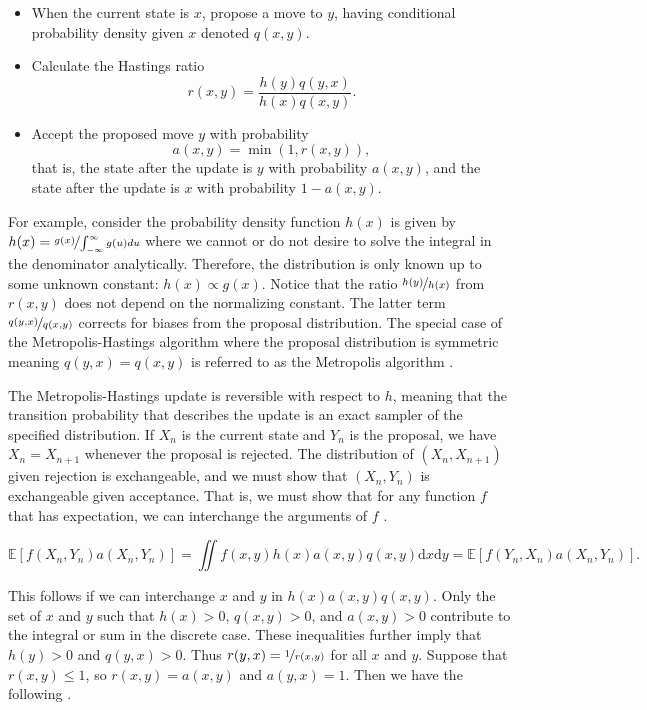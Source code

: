 \documentclass[../../../main.tex]{subfiles}
\begin{document}
\begin{itemize}
\item When the current state is $x$, propose a move to $y$, having conditional probability density given $x$ denoted $q(x, y)$.
\item Calculate the Hastings ratio
\begin{equation}
r(x,y) = \frac{h(y)q(y,x)}{h(x)q(x,y)}.
\end{equation}
\item Accept the proposed move $y$ with probability
\begin{equation}
a(x,y) = \min(1,r(x,y)),
\end{equation}
that is, the state after the update is $y$ with probability $a(x,y)$, and the state after the update is $x$ with probability $1-a(x,y)$.
\end{itemize}

For example, consider the probability density function $h(x)$ is given by $h(x) = \nicefrac{g(x)}{\int_{-\infty}^{\infty}g(u)du}$ where we cannot or do not desire to solve the integral in the denominator analytically. Therefore, the distribution is only known up to some unknown constant: $h(x) \propto g(x)$. Notice that the ratio $\nicefrac{h(y)}{h(x)}$ from $r(x,y)$ does not depend on the normalizing constant. The latter term $\nicefrac{q(y,x)}{q(x,y)}$ corrects for biases from the proposal distribution. The special case of the Metropolis-Hastings algorithm where the proposal distribution is symmetric meaning $q(y,x)=q(x,y)$ is referred to as the Metropolis algorithm \autocite{Brooks2011}.

The Metropolis-Hastings update is reversible with respect to $h$, meaning that the transition probability that describes the update is an exact sampler of the specified distribution. If $X_n$ is the current state and $Y_n$ is the proposal, we have $X_n=X_{n+1}$ whenever the proposal is rejected. The distribution of $(X_n,X_{n+1})$ given rejection is exchangeable, and we must show that $(X_n,Y_n)$ is exchangeable given acceptance. That is, we must show that for any function $f$ that has expectation, we can interchange the arguments of $f$ \autocite{Brooks2011}.

\[
\mathbb{E}[f(X_n,Y_n)a(X_n,Y_n)] = \iint f(x,y)h(x)a(x,y)q(x,y)\mathrm{d}x\mathrm{d}y = \mathbb{E}[f(Y_n,X_n)a(X_n,Y_n)].
\]

This follows if we can interchange $x$ and $y$ in $h(x)a(x,y)q(x,y)$. Only the set of $x$ and $y$ such that $h(x)>0$, $q(x,y)>0$, and $a(x,y)>0$ contribute to the integral or sum in the discrete case. These inequalities further imply that $h(y)>0$ and $q(y,x)>0$. Thus $r(y,x)=\nicefrac{1}{r(x,y)}$ for all $x$ and $y$. Suppose that $r(x,y) \leq 1$, so $r(x,y)=a(x,y)$ and $a(y,x)=1$. Then we have the following \autocite{Brooks2011}.
\end{document}
